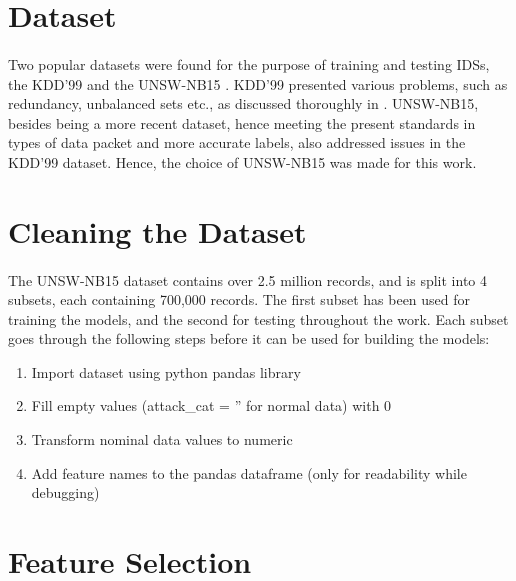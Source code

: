\section{Dataset}
\paragraph{}
Two popular datasets were found for the purpose of training and testing IDSs, the KDD'99 \cite{kdd99} and the UNSW-NB15 \cite{unsw15}. KDD'99 presented various problems, such as redundancy, unbalanced sets etc., as discussed thoroughly in \cite{unsw_comparison}. UNSW-NB15, besides being a more recent dataset, hence meeting the present standards in types of data packet and more accurate labels, also addressed issues in the KDD'99 dataset. Hence, the choice of UNSW-NB15 was made for this work.

\section{Cleaning the Dataset}
\paragraph{}
The UNSW-NB15 dataset contains over 2.5 million records, and is split into 4 subsets, each containing 700,000 records. The first subset has been used for training the models, and the second for testing throughout the work. Each subset goes through the following steps before it can be used for building the models:
\begin{enumerate}
    \item Import dataset using python pandas library
    \item Fill empty values (attack\_cat = '' for normal data) with 0
    \item Transform nominal data values to numeric
    \item Add feature names to the pandas dataframe (only for readability while debugging)
\end{enumerate}

\section{Feature Selection}
\label{feature_select}
